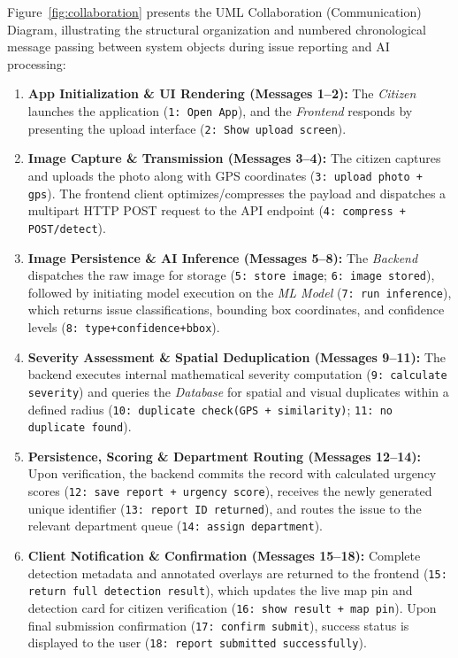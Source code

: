 \documentclass{tietreport}
\begin{document}
Figure~\ref{fig:collaboration} presents the UML Collaboration (Communication) Diagram, illustrating the structural organization and numbered chronological message passing between system objects during issue reporting and AI processing:
\begin{enumerate}
  \item \textbf{App Initialization \& UI Rendering (Messages 1--2):} The \textit{Citizen} launches the application (\texttt{1: Open App}), and the \textit{Frontend} responds by presenting the upload interface (\texttt{2: Show upload screen}).
  \item \textbf{Image Capture \& Transmission (Messages 3--4):} The citizen captures and uploads the photo along with GPS coordinates (\texttt{3: upload photo + gps}). The frontend client optimizes/compresses the payload and dispatches a multipart HTTP POST request to the API endpoint (\texttt{4: compress + POST/detect}).
  \item \textbf{Image Persistence \& AI Inference (Messages 5--8):} The \textit{Backend} dispatches the raw image for storage (\texttt{5: store image}; \texttt{6: image stored}), followed by initiating model execution on the \textit{ML Model} (\texttt{7: run inference}), which returns issue classifications, bounding box coordinates, and confidence levels (\texttt{8: type+confidence+bbox}).
  \item \textbf{Severity Assessment \& Spatial Deduplication (Messages 9--11):} The backend executes internal mathematical severity computation (\texttt{9: calculate severity}) and queries the \textit{Database} for spatial and visual duplicates within a defined radius (\texttt{10: duplicate check(GPS + similarity)}; \texttt{11: no duplicate found}).
  \item \textbf{Persistence, Scoring \& Department Routing (Messages 12--14):} Upon verification, the backend commits the record with calculated urgency scores (\texttt{12: save report + urgency score}), receives the newly generated unique identifier (\texttt{13: report ID returned}), and routes the issue to the relevant department queue (\texttt{14: assign department}).
  \item \textbf{Client Notification \& Confirmation (Messages 15--18):} Complete detection metadata and annotated overlays are returned to the frontend (\texttt{15: return full detection result}), which updates the live map pin and detection card for citizen verification (\texttt{16: show result + map pin}). Upon final submission confirmation (\texttt{17: confirm submit}), success status is displayed to the user (\texttt{18: report submitted successfully}).
\end{enumerate}
\end{document}
